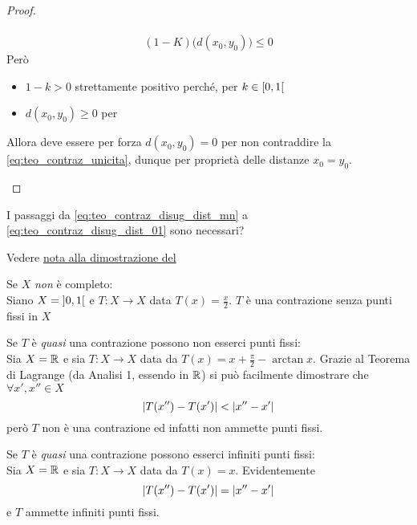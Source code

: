 \begin{theorem}
\begin{proof}
\begin{enumerate}
\begin{equation*}
\begin{gathered}
					\end{gathered}
				\end{equation*}
				\begin{equation}
					\label{eq:teo_contraz_unicita}
					(1-K) \bigl( d(x_0, y_0) \bigr) \leq 0
				\end{equation}
				Però
				\begin{itemize}
					\item $1-k > 0$ strettamente positivo perché, per  $k \in \left[0,1\right[$
					\item $d(x_0, y_0) \geq 0$ per 
				\end{itemize}
				Allora deve essere per forza $d(x_0, y_0) = 0$ per non contraddire la \cref{eq:teo_contraz_unicita}, dunque per proprietà delle distanze $x_0 = y_0$.
		\end{enumerate}
	\end{proof}
\end{theorem}
\begin{exercise}
	I passaggi da \cref{eq:teo_contraz_disug_dist_mn} a \cref{eq:teo_contraz_disug_dist_01} sono necessari?
	\begin{solution}
		Vedere \hyperlink{note:teo_contraz_note}{nota alla dimostrazione del }
	\end{solution}
\end{exercise}
\begin{example}
	Se $X$ \textit{non} è completo:\\
	Siano $X = \left]0,1\right[$ e $T: X \to X$ data $T(x) = \frac{x}{2}$. $T$ è una contrazione senza punti fissi in $X$
\end{example}
\begin{example}
	Se $T$ è \textit{quasi} una contrazione possono non esserci punti fissi:\\
	Sia $X = \mathbb{R}$ e sia $T:X \to X$ data da $T(x) = x + \frac{\pi}{2} - \arctan x$. Grazie al Teorema di Lagrange (da Analisi 1, essendo in $\mathbb{R}$) si può facilmente dimostrare che $\forall x', x'' \in X$
	\[\left|T(x'') - T(x')\right| < \left|x'' - x'\right|\]
	però $T$ non è una contrazione ed infatti non ammette punti fissi.
\end{example}
\begin{example}
	Se $T$ è \textit{quasi} una contrazione possono esserci infiniti punti fissi:\\
	Sia $X = \mathbb{R}$ e sia $T:X \to X$ data da $T(x) = x$. Evidentemente
	\[\left|T(x'') - T(x')\right| = \left|x'' - x'\right|\]
	e $T$ ammette infiniti punti fissi.
\end{example}
